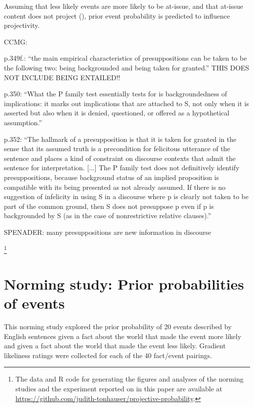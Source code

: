 \documentclass[11pt,fleqn]{article}
\newcommand{\6}{\mbox{$[\hspace*{-.6mm}[$}}
\newcommand{\9}{\mbox{$]\hspace*{-.6mm}]$}}
\begin{document}
Assuming that less likely events are more likely to be at-issue, and that at-issue content does not project (\citealt{brst-salt10,tbd-variability}), prior event probability is predicted to influence projectivity.

CCMG:

p.349f.: ``the main empirical characteristics of presuppositions can be taken to be the following two: being backgrounded and being taken for granted.'' THIS DOES NOT INCLUDE BEING ENTAILED!! 

p.350: ``What the P family test essentially tests for is backgroundedness of implications: it marks out implications that are attached to S, not only when it is asserted but also when it is denied, questioned, or offered as a hypothetical assumption.''

p.352: ``The hallmark of a presupposition is that it is taken for granted in the sense that its assumed truth is a precondition for felicitous utterance of the sentence and places a kind of constraint on discourse contexts that admit the sentence for interpretation. [...] The P family test does not definitively identify presuppositions, because background status of an implied proposition is compatible with its being presented as not already assumed. If there is no suggestion of infelicity in using S in a discourse where p is clearly not taken to be part of the common ground, then S does not presuppose p even if p is backgrounded by S (as in the case of nonrestrictive relative clauses).''

SPENADER: many presuppositions are new information in discourse 

\footnote{\label{f-github}The
data and R code for generating the figures and analyses
of the norming studies and the experiment reported on in this paper are available at \url{https://github.com/judith-tonhauser/projective-probability}.}

\newpage

\section{Norming study: Prior probabilities of events}\label{s-norming-prior}

This norming study explored the prior probability of 20 events described by English sentences given a fact about the world that made the event more likely and given a fact about the world that made the event less likely. Gradient likeliness ratings were collected for each of the 40 fact/event pairings.
\end{document}
